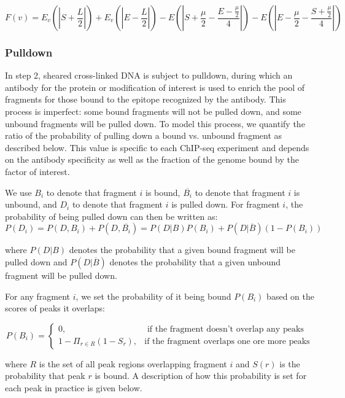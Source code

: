 \documentclass[12pt]{article}
\begin{document}
\begin{equation}
F(v) = E_v(|S + \frac{L}{2}|) + E_v(|E - \frac{L}{2}|) - E(|S + \frac{\mu}{2} - \frac{E- \frac{\mu}{2}}{4}|) - E(|E- \frac{\mu}{2} - \frac{S + \frac{\mu}{2}}{4}|)
\end{equation}

\subsubsection*{Pulldown}
In step 2, sheared cross-linked DNA is subject to pulldown, during which an antibody for the protein or modification of interest is used to enrich the pool of fragments for those bound to the epitope recognized by the antibody.
This process is imperfect: some bound fragments will not be pulled down, and some unbound fragments will be pulled down.
To model this process, we quantify the ratio of the probability of pulling down a bound vs. unbound fragment as described below.
This value is specific to each ChIP-seq experiment and depends on the antibody specificity as well as the fraction of the genome bound by the factor of interest.

We use $B_i$ to denote that fragment $i$ is bound, $\overline{B_i}$ to denote that fragment $i$ is unbound, and $D_i$ to denote that fragment $i$ is pulled down. For fragment $i$, the probability of being pulled down can then be written as:
\begin{equation} \label{eq:pulldown}
  P(D_i) = P(D, B_i) + P(D, \overline{B_i}) = P(D|B)P(B_i) + P(D|\overline{B})(1-P(B_i))
\end{equation}

where $P(D|B)$ denotes the probability that a given bound fragment will be pulled down and $P(D|\overline{B})$ denotes the probability that a given unbound fragment will be pulled down.

For any fragment $i$, we set the probability of it being bound $P(B_i)$ based on the scores of peaks it overlaps:

\begin{equation}
  P(B_i) = \begin{cases}
    0, & \text{ if the fragment doesn't overlap any peaks} \\
    1-\Pi_{r \in R} (1-S_r), & \text {if the fragment overlaps one ore more peaks}
    \end{cases}
\end{equation}

where $R$ is the set of all peak regions overlapping fragment $i$ and $S(r)$ is the probability that peak $r$ is bound. A description of how this probability is set for each peak in practice is given below.
\end{document}
